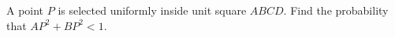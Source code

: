 A point $P$ is selected uniformly inside unit square $ABCD$. Find the probability that $AP^2+BP^2<1$.
